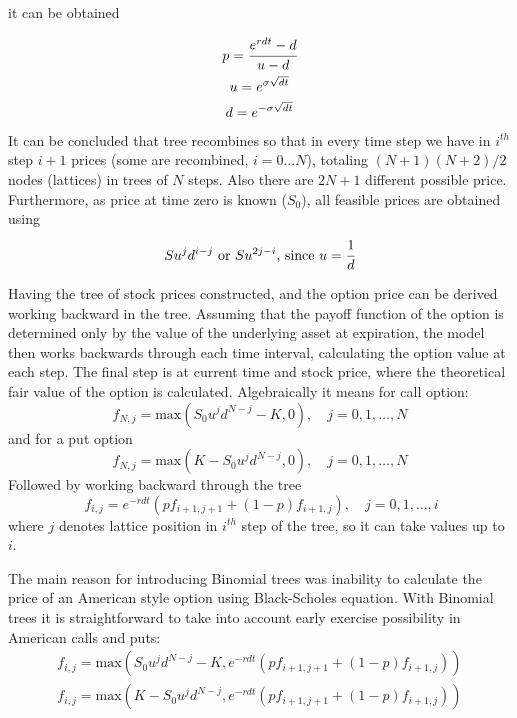 it can be obtained

\begin{equation}
\begin{gathered}
p=\cfrac{e^{rdt}-d}{u-d}\\
u = e^{\sigma\sqrt{dt}} \\
d = e^{-\sigma\sqrt{dt}}
\end{gathered}
\end{equation}
It can be concluded that tree recombines so that in every time step we have in $i^{th}$ step $i+1$ prices (some are recombined, $i=0\ldots N$), totaling $(N+1)(N+2)/2$ nodes (lattices) in trees of $N$ steps. Also there are $2N+1$ different possible price. Furthermore, as price at time zero is known ($S_0$), all feasible prices are obtained using
\begin{equation}
Su^j d^{i-j}\textrm{ or }Su^{2j-i}\textrm{, since }u=\cfrac{1}{d}
\end{equation}

Having the tree of stock prices constructed, and the option price can be derived working backward in the tree. %
Assuming that the payoff function of the option is determined only by the value of the underlying asset at expiration, the model then works backwards through each time interval, calculating the option value at each step. The final step is at current time and stock price, where the theoretical fair value of the option is calculated. Algebraically it means for call option:
\begin{equation}
f_{N,j} = \textrm{max}(S_0 u^{j} d^{N-j} - K, 0),\quad j=0,1,\ldots , N
\end{equation}
\noindent
and for a put option
\begin{equation}
f_{N,j} = \textrm{max}(K - S_0 u^{j} d^{N-j}, 0),\quad j=0,1,\ldots , N
\end{equation}
Followed by working backward through the tree
\begin{equation}\
f_{i,j} = e^{-rdt}\left(pf_{i+1,j+1} + (1-p)f_{i+1,j}\right),\quad j=0,1,\ldots , i
\end{equation}
where $j$ denotes lattice position in $i^{th}$ step of the tree, so it can take values up to $i$.

The main reason for introducing Binomial trees was inability to calculate the price of an American style option using Black-Scholes equation. With Binomial trees it is straightforward to take into account early exercise possibility in American calls and puts:
\begin{equation}
\begin{gathered}
f_{i,j} = \textrm{max}\left(S_0 u^{j} d^{N-j} - K, e^{-rdt}\left(pf_{i+1,j+1} + (1-p)f_{i+1,j}\right)\right) \\
f_{i,j} = \textrm{max}\left(K - S_0 u^{j} d^{N-j}, e^{-rdt}\left(pf_{i+1,j+1} + (1-p)f_{i+1,j}\right)\right)
\end{gathered}
\end{equation}

